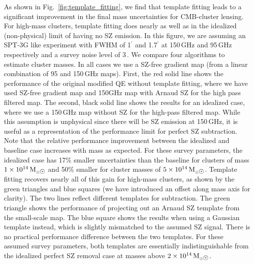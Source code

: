 As shown in Fig.~\ref{fig:template_fitting}, we find that template fitting leads to a significant improvement in the final mass uncertainties for CMB-cluster lensing. 
For high-mass clusters, template fitting does nearly as well as in the idealized (non-physical) limit of having no SZ emission. 
In this figure, we are assuming an SPT-3G like experiment with FWHM of 1$^\prime$ and 1.7$^\prime$ at 150\,GHz and  95\,GHz respectively and a survey noise level of 3\,\ukarcmin{}. 
We compare four algorithms to estimate cluster masses. 
In all cases we use a SZ-free gradient map (from a linear combination of 95 and 150\,GHz maps). 
First, the red solid line shows the performance of the original modified QE without template fitting, where we have used SZ-free gradient map and 150GHz map with Arnaud SZ for the high pass filtered map. 
The second, black solid line shows the results for an idealized case, where we use a 150\,GHz map without SZ for the high-pass filtered map. 
While this assumption is unphysical since there will be SZ emission at 150\,GHz, it is useful as a representation of the performance limit for perfect SZ subtraction. 
Note that the relative performance improvement between the idealized and baseline case increases with mass as expected. 
For these survey parameters, the idealized case has 17\% smaller uncertainties than the baseline for clusters of mass $1\times 10^{14}\,\msolar$ and 50\% smaller for cluster masses of $5\times 10^{14}\,\msolar$. 
Template fitting recovers nearly all of this gain for high-mass clusters, as shown by the green triangles and blue squares (we have introduced an offset along mass axis for clarity). 
The two lines reflect different templates for subtraction. 
The green triangle shows the performance of projecting out an Arnaud SZ template from the small-scale map. 
The blue square shows the results when using a Gaussian template instead, which is slightly mismatched to the assumed SZ signal. 
There is no practical performance difference between the two templates. 
For these assumed survey parameters, both templates are essentially indistinguishable from the idealized perfect SZ removal case at masses above $2\times 10^{14}\,\msolar$. 
